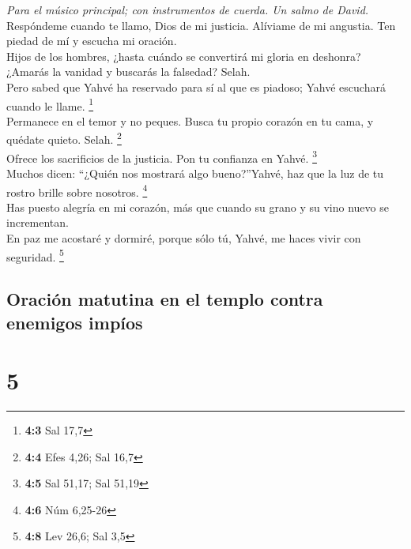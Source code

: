 \emph{Para el músico principal; con instrumentos de cuerda. Un salmo de
David.}\\
 Respóndeme cuando te llamo, Dios de mi justicia. Alíviame
de mi angustia. Ten piedad de mí y escucha mi oración.\\
 Hijos de los hombres, ¿hasta cuándo se convertirá mi
gloria en deshonra? ¿Amarás la vanidad y buscarás la falsedad? Selah.\\
 Pero sabed que Yahvé ha reservado para sí al que es
piadoso; Yahvé escuchará cuando le llame. \footnote{\textbf{4:3} Sal
  17,7}\\
 Permanece en el temor y no peques. Busca tu propio
corazón en tu cama, y quédate quieto. Selah. \footnote{\textbf{4:4} Efes
  4,26; Sal 16,7}\\
 Ofrece los sacrificios de la justicia. Pon tu confianza
en Yahvé. \footnote{\textbf{4:5} Sal 51,17; Sal 51,19}\\
 Muchos dicen: ``¿Quién nos mostrará algo bueno?''Yahvé,
haz que la luz de tu rostro brille sobre nosotros. \footnote{\textbf{4:6}
  Núm 6,25-26}\\
 Has puesto alegría en mi corazón, más que cuando su grano
y su vino nuevo se incrementan.\\
 En paz me acostaré y dormiré, porque sólo tú, Yahvé, me
haces vivir con seguridad. \footnote{\textbf{4:8} Lev 26,6; Sal 3,5}

\hypertarget{oraciuxf3n-matutina-en-el-templo-contra-enemigos-impuxedos}{%
\subsection{Oración matutina en el templo contra enemigos
impíos}\label{oraciuxf3n-matutina-en-el-templo-contra-enemigos-impuxedos}}

\hypertarget{section-4}{%
\section{5}\label{section-4}}

